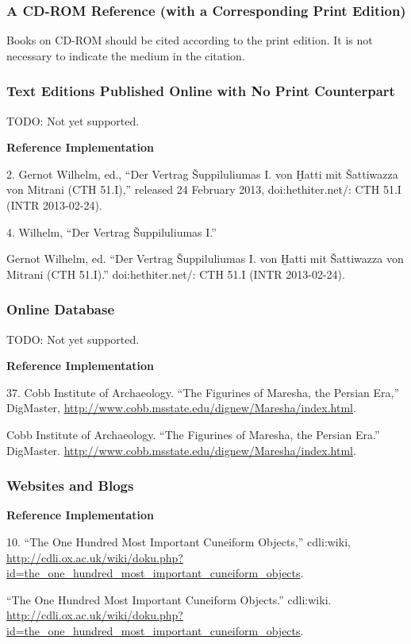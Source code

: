 \documentclass[a4paper]{article}
\newenvironment{refimp}{%
  \begin{minipage}{\linewidth}
    \setlength{\parskip}{1ex}
    \textbf{Reference Implementation}\par
    \nobreak
    \color{reference-colour}
}{\end{minipage}}
\begin{document}
\subsubsection{A CD-ROM Reference (with a Corresponding Print Edition)}

Books on CD-ROM should be cited according to the print edition. It is not
necessary to indicate the medium in the citation.

\subsubsection{Text Editions Published Online with No Print Counterpart}

TODO: Not yet supported.

\begin{refimp}
  2. Gernot Wilhelm, ed., “Der Vertrag Šuppiluliumas I. von Ḫatti mit
  Šattiwazza von Mitrani (CTH 51.I),” released 24 February 2013,
  doi:hethiter.net/: CTH 51.I (INTR 2013-02-24).

  4. Wilhelm, “Der Vertrag Šuppiluliumas I.”

  \hangindent\bibindent Gernot Wilhelm, ed. “Der Vertrag Šuppiluliumas I. von
  Ḫatti mit Šattiwazza von Mitrani (CTH 51.I).” doi:hethiter.net/: CTH 51.I
  (INTR 2013-02-24).
\end{refimp}

\subsubsection{Online Database}

TODO: Not yet supported.

\begin{refimp}
  37. Cobb Institute of Archaeology. “The Figurines of Maresha, the Persian
  Era,” DigMaster,
  \url{http://www.cobb.msstate.edu/dignew/Maresha/index.html}.

  \hangindent\bibindent Cobb Institute of Archaeology. “The Figurines of
  Maresha, the Persian Era.” DigMaster.
  \url{http://www.cobb.msstate.edu/dignew/Maresha/index.html}.
\end{refimp}

\subsubsection{Websites and Blogs}

\begin{refimp}
  \raggedright 

  10. “The One Hundred Most Important Cuneiform Objects,” cdli:wiki,
  \url{http://cdli.ox.ac.uk/wiki/doku.php?id=the_one_hundred_most_important_cuneiform_objects}.

  \hangindent\bibindent “The One Hundred Most Important Cuneiform Objects.”
  cdli:wiki.
  \url{http://cdli.ox.ac.uk/wiki/doku.php?id=the_one_hundred_most_important_cuneiform_objects}.
\end{refimp}

\printbibliography
\end{document}
